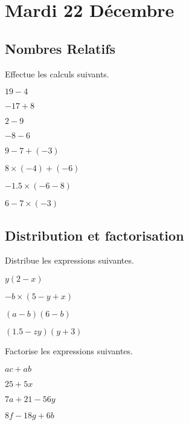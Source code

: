 \section{Mardi 22 Décembre}

\subsection{Nombres Relatifs}

\begin{exercice}
    Effectue les calculs suivants.
    \begin{exerciceenum}
        \item $19 - 4$
        \item $-17 + 8$
        \item $2 - 9$
        \item $- 8 - 6$
        \item $9 - 7 + (-3)$
        \item $8 \times (-4) + (-6)$
        \item $-1.5 \times (-6 - 8)$
        \item $6 - 7 \times (-3)$
    \end{exerciceenum}
\end{exercice}

\subsection{Distribution et factorisation}

\begin{exercice}
    Distribue les expressions suivantes.
    \begin{exerciceenum}
        \item $y(2 - x)$
        \item $-b\times (5 - y + x)$
        \item $(a - b)(6 - b)$
        \item $(1.5 - zy)(y + 3)$
    \end{exerciceenum}
\end{exercice}

\begin{exercice}
    Factorise les expressions suivantes.
    \begin{exerciceenum}
        \item $ac + ab$
        \item $25 + 5x$
        \item $7a + 21 - 56y$
        \item $8f - 18g + 6b$
    \end{exerciceenum}
\end{exercice}

